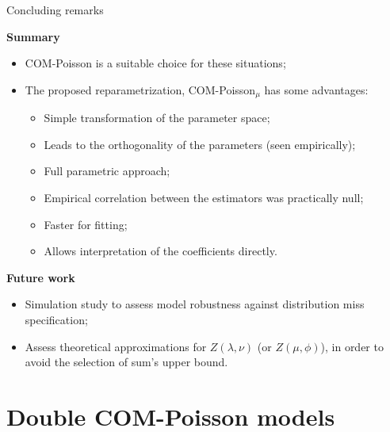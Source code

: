 \documentclass[11pt]{beamer}\usepackage[]{graphicx}\usepackage[]{color}
\begin{document}
\begin{frame}{Concluding remarks}

  {\bf Summary}
  \begin{itemize}
    \item COM-Poisson is a suitable choice for these situations;
    \item The proposed reparametrization, COM-Poisson$_\mu$ has some
      advantages:
      \begin{itemize}
        \item Simple transformation of the parameter space;
        \item Leads to the orthogonality of the parameters (seen
          empirically);
        \item Full parametric approach;
        \item Empirical correlation between the estimators was
          practically null;
        \item Faster for fitting;
        \item Allows interpretation of the coefficients directly.
      \end{itemize}
  \end{itemize}

  {\bf Future work}
  \begin{itemize}
    \item Simulation study to assess model robustness against
      distribution miss specification;
    \item Assess theoretical approximations for $Z(\lambda, \nu)$
      (or $Z(\mu, \phi)$), in order to avoid the selection of sum's
      upper bound.
  \end{itemize}
\end{frame}

\section{Double COM-Poisson models}
\end{document}
